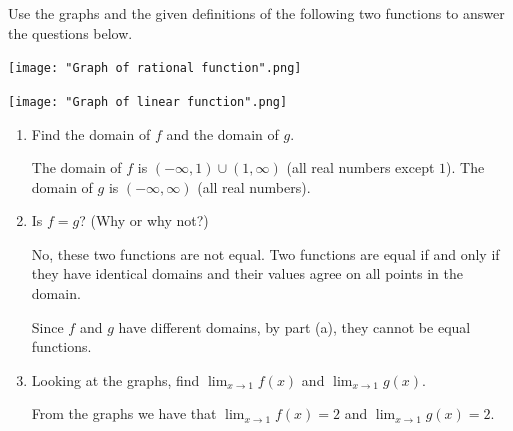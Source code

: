 \documentclass[nooutcomes,handout]{ximera}
\begin{document}
\begin{problem}
Use the graphs and the given definitions of the following two functions to answer the questions below.
	
	\begin{image}

    \texttt{[image: "Graph of rational function".png]}
  \end{image}
\begin{image}
        \texttt{[image: "Graph of linear function".png]}
  \end{image}

	\begin{enumerate}
	
	  \item Find the domain of $f$ and the domain of $g$.
      \begin{freeResponse}
        The domain of $f$ is $(-\infty, 1) \cup (1, \infty)$ (all real numbers except $1$).
        The domain of $g$ is $(-\infty, \infty)$ (all real numbers).
      \end{freeResponse}
	
  	\item Is $f = g$?
      (Why or why not?)
      \begin{freeResponse}
        No, these two functions are not equal.
        Two functions are equal if and only if they have identical domains and their values agree on all points in the domain.

        Since $f$ and $g$ have different domains, by part (a), they cannot be equal functions.
	\end{freeResponse}
	
	 \item  Looking at the graphs, find $\lim_{x \to 1} f(x)$ and $\lim_{x \to 1} g(x)$.
      \begin{freeResponse}
        From the graphs we have that $\lim_{x \to 1} f(x) = 2$ and $\lim_{x \to 1} g(x) = 2$.
      \end{freeResponse}

	\end{enumerate}
\end{problem}
			
\end{document}
